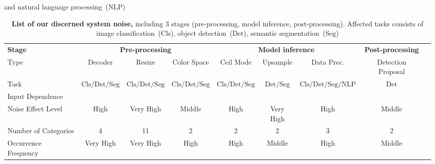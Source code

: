 
\newcommand{\cmark}{\color{ForestGreen}\ding{51}}%
\newcommand{\xmark}{\color{Red}\ding{55}}%
\newcommand{\clsdet}{$\mathrm{Cls/Det/Seg}$}
\begin{table*}[htbp]
\caption{\textbf{List of our discerned system noise,} including 3 stages (pre-processing, model inference, post-processing). Affected tasks consists of image classification~($\mathrm{Cls}$), object detection~($\mathrm{Det}$), semantic segmentation~($\mathrm{Seg}$) } and natural language processing~($\mathrm{NLP}$)%
\label{tab_sysnoise_type}
\centering
\begin{adjustbox}{max width=\textwidth}
\begin{tabular}{lcccccccc}
\toprule
\textbf{Stage} & \multicolumn{3}{c}{\textbf{Pre-processing}} & \multicolumn{3}{c}{\textbf{Model inference}} & \multicolumn{1}{c}{\textbf{Post-processing}} \\
\cmidrule(l{2pt}r{2pt}){2-4}\cmidrule(l{2pt}r{2pt}){5-7}
\cmidrule(l{2pt}r{2pt}){8-8}
Type & Decoder & Resize & Color Space & Ceil Mode & Upsample & Data Prec. & Detection Proposal \\
\midrule
Task & \clsdet & \clsdet & \clsdet & \clsdet & $\mathrm{Det/Seg}$ & $\mathrm{Cls/Det/Seg/NLP}$ & $\mathrm{Det}$ \\ Input Dependence & \xmark & \xmark &  \cmark & \xmark &  \xmark & \cmark &  \xmark \\
Noise Effect Level & High & Very High & Middle & High & Very High & High & Middle \\
Number of Categories & 4 & 11 & 2 & 2 & 2 & 3 & 2 \\
Occurrence Frequency & Very High & Very High & High & High & Middle & High & Middle \\
\bottomrule
\end{tabular}
\end{adjustbox}
\end{table*}




